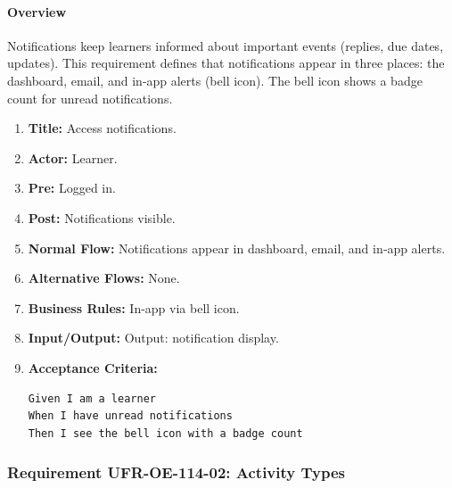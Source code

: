 \paragraph{Overview}
Notifications keep learners informed about important events (replies, due dates, updates). This requirement defines that notifications appear in three places: the dashboard, email, and in‑app alerts (bell icon). The bell icon shows a badge count for unread notifications.
\begin{enumerate}[label=\textbf{\arabic*.}]
\item \textbf{Title:} Access notifications.
\item \textbf{Actor:} Learner.
\item \textbf{Pre:} Logged in.
\item \textbf{Post:} Notifications visible.
\item \textbf{Normal Flow:} Notifications appear in dashboard, email, and in‑app alerts.
\item \textbf{Alternative Flows:} None.
\item \textbf{Business Rules:} In-app via bell icon.
\item \textbf{Input/Output:} Output: notification display.
\item \textbf{Acceptance Criteria:}
    \begin{verbatim}
Given I am a learner
When I have unread notifications
Then I see the bell icon with a badge count
    \end{verbatim}
\end{enumerate}

\subsubsection{Requirement UFR-OE-114-02: Activity Types}
